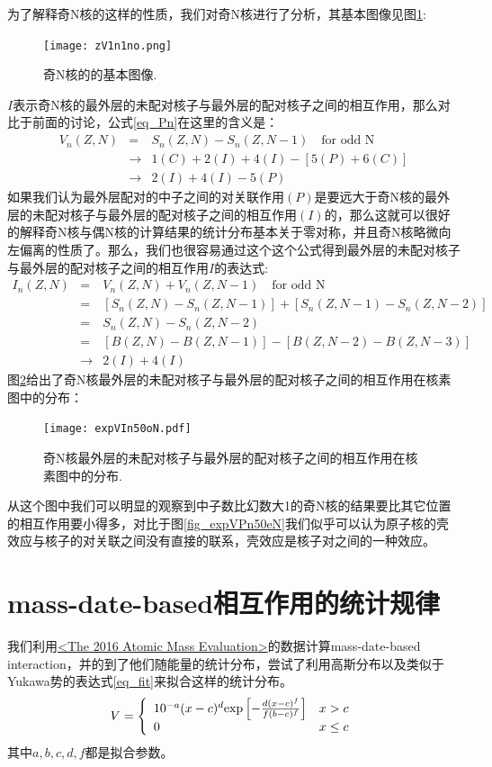 为了解释奇N核的这样的性质，我们对奇N核进行了分析，其基本图像见图\ref{fig_zV1n1no}:
\begin{figure}[H]
\centering
\texttt{[image: zV1n1no.png]}
\caption{奇N核的的基本图像.\label{fig_zV1n1no}}
\end{figure}
$I$表示奇N核的最外层的未配对核子与最外层的配对核子之间的相互作用，那么对比于前面的讨论，公式\ref{eq_Pn}在这里的含义是：
\begin{eqnarray}
V_n(Z,N)&=&S_n(Z,N)-S_n(Z,N-1)\quad \textrm{for odd N}\\ \nonumber
&\to&1(C)+2(I)+4(I)-[5(P)+6(C)]\\ \nonumber
&\to&2(I)+4(I)-5(P)\nonumber
\end{eqnarray}
如果我们认为最外层配对的中子之间的对关联作用$(P)$是要远大于奇N核的最外层的未配对核子与最外层的配对核子之间的相互作用$(I)$的，那么这就可以很好的解释奇N核与偶N核的计算结果的统计分布基本关于零对称，并且奇N核略微向左偏离的性质了。那么，我们也很容易通过这个这个公式得到最外层的未配对核子与最外层的配对核子之间的相互作用$I$的表达式:
\begin{eqnarray}\label{eq_In}
I_n(Z,N)&=&V_n(Z,N)+V_n(Z,N-1)\quad \textrm{for odd N}\\
&=&[S_n(Z,N)-S_n(Z,N-1)]+[S_n(Z,N-1)-S_n(Z,N-2)]\nonumber\\
&=&S_n(Z,N)-S_n(Z,N-2)\nonumber\\
&=&[B(Z,N)-B(Z,N-1)]-[B(Z,N-2)-B(Z,N-3)]\nonumber\\
&\to&2(I)+4(I)\nonumber
\end{eqnarray}
图\ref{fig_expVIn50oN}给出了奇N核最外层的未配对核子与最外层的配对核子之间的相互作用在核素图中的分布：
\begin{figure}[H]
\centering
\texttt{[image: expVIn50oN.pdf]}
\caption{奇N核最外层的未配对核子与最外层的配对核子之间的相互作用在核素图中的分布.\label{fig_expVIn50oN}}
\end{figure}
\noindent 从这个图中我们可以明显的观察到中子数比幻数大1的奇N核的结果要比其它位置的相互作用要小得多，对比于图\ref{fig_expVPn50eN}我们似乎可以认为原子核的壳效应与核子的对关联之间没有直接的联系，壳效应是核子对之间的一种效应。
\section{mass-date-based相互作用的统计规律}
我们利用\href{http://amdc.impcas.ac.cn/web/masseval.html}{<The 2016 Atomic Mass Evaluation>}的数据计算mass-date-based interaction，并的到了他们随能量的统计分布，尝试了利用高斯分布以及类似于Yukawa势的表达式\ref{eq_fit}来拟合这样的统计分布。
\begin{equation}\label{eq_fit}
V=\left\{\begin{array}{ll}
10^{-a}(x-c)^d{\rm exp}\left[-\frac{d(x-c)^f}{f(b-c)^f}\right]&x>c\\
0&x\le c
\end{array}\right.
\end{equation}
其中$a,b,c,d,f$都是拟合参数。

